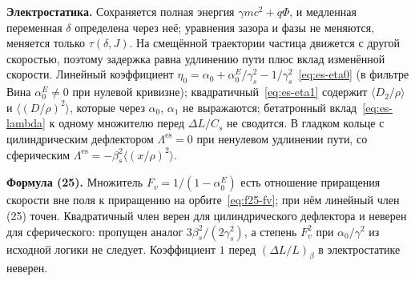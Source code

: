 \textbf{Электростатика.} Сохраняется полная энергия $\gamma mc^2+q\Phi$, и медленная переменная $\delta$ определена через неё; уравнения зазора и фазы не меняются, меняется только $\tau(\delta,J)$. На смещённой траектории частица движется с другой скоростью, поэтому задержка равна удлинению пути плюс вклад изменённой скорости. Линейный коэффициент $\eta_0=\alpha_0+\alpha_0^E/\gamma_s^2-1/\gamma_s^2$~\eqref{eq:es-eta0} (в фильтре Вина $\alpha_0^E\neq 0$ при нулевой кривизне); квадратичный~\eqref{eq:es-eta1} содержит $\langle D_2/\rho\rangle$ и $\langle(D/\rho)^2\rangle$, которые через $\alpha_0$, $\alpha_1$ не выражаются; бетатронный вклад~\eqref{eq:es-lambda} к одному множителю перед $\Delta L/C_s$ не сводится. В гладком кольце с цилиндрическим дефлектором $\Lambda^{\mathrm{es}}=0$ при ненулевом удлинении пути, со сферическим $\Lambda^{\mathrm{es}}=-\beta_s^2\langle(x/\rho)^2\rangle$.

\textbf{Формула (25).} Множитель $F_v=1/(1-\alpha_0^E)$ есть отношение приращения скорости вне поля к приращению на орбите~\eqref{eq:f25-fv}; при нём линейный член (25) точен. Квадратичный член верен для цилиндрического дефлектора и неверен для сферического: пропущен аналог $3\beta_s^2/(2\gamma_s^2)$, а степень $F_v^2$ при $\alpha_0/\gamma^2$ из исходной логики не следует. Коэффициент $1$ перед $(\Delta L/L)_\beta$ в электростатике неверен.

